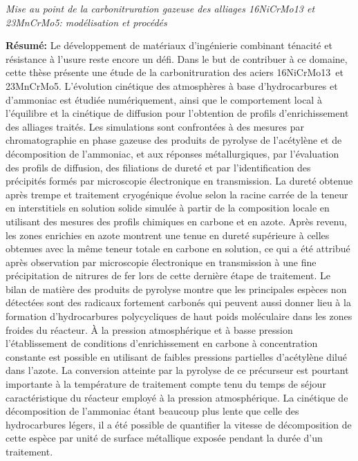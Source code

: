\documentclass[10pt]{article}
\begin{document}
\noindent\emph{Mise au point de la carbonitruration gazeuse des alliages
16NiCrMo13 et 23MnCrMo5: modélisation et procédés}\par\vskip0.4cm

\noindent\textbf{Résumé:} Le développement de matériaux d'ingénierie combinant
ténacité et résistance à l'usure reste encore un défi. Dans le but de contribuer
à ce domaine, cette thèse présente une étude de la carbonitruration des aciers
16NiCrMo13 et 23MnCrMo5. L'évolution cinétique des atmosphères à base
d'hydrocarbures et d'ammoniac est étudiée numériquement, ainsi que le
comportement local à l'équilibre et la cinétique de diffusion pour l'obtention
de profils d'enrichissement des alliages traités. Les simulations sont
confrontées à des mesures par chromatographie en phase gazeuse des produits de
pyrolyse de l'acétylène et de décomposition de l'ammoniac, et aux réponses
métallurgiques, par l'évaluation des profils de diffusion, des filiations de
dureté et par l'identification des précipités formés par microscopie
électronique en transmission. La dureté obtenue après trempe et traitement
cryogénique évolue selon la racine carrée de la teneur en interstitiels en
solution solide simulée à partir de la composition locale en utilisant des
mesures des profils chimiques en carbone et en azote. Après revenu, les zones
enrichies en azote montrent une tenue en dureté supérieure à celles obtenues
avec la même teneur totale en carbone en solution, ce qui a été attribué après
observation par microscopie électronique en transmission à une fine
précipitation de nitrures de fer lors de cette dernière étape de traitement. Le
bilan de matière des produits de pyrolyse montre que les principales espèces non
détectées sont des radicaux fortement carbonés qui peuvent aussi donner lieu à
la formation d'hydrocarbures polycycliques de haut poids moléculaire dans les
zones froides du réacteur. À la pression atmosphérique et à basse pression
l'établissement de conditions d'enrichissement en carbone à concentration
constante est possible en utilisant de faibles pressions partielles d'acétylène
dilué dans l'azote. La conversion atteinte par la pyrolyse de ce précurseur est
pourtant importante à la température de traitement compte tenu du temps de
séjour caractéristique du réacteur employé à la pression atmosphérique. La
cinétique de décomposition de l'ammoniac étant beaucoup plus lente que celle des
hydrocarbures légers, il a été possible de quantifier la vitesse de
décomposition de cette espèce par unité de surface métallique exposée pendant la
durée d'un traitement.
\end{document}
